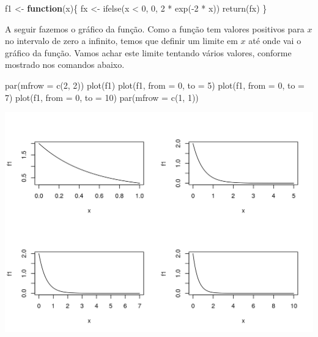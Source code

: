 \documentclass[
  10pt,
  a4paper]{book}
\newenvironment{Shaded}{\begin{snugshade}}{\end{snugshade}}
\newcommand{\AttributeTok}[1]{\textcolor[rgb]{0.77,0.63,0.00}{#1}}
\newcommand{\ControlFlowTok}[1]{\textcolor[rgb]{0.13,0.29,0.53}{\textbf{#1}}}
\newcommand{\DecValTok}[1]{\textcolor[rgb]{0.00,0.00,0.81}{#1}}
\newcommand{\FunctionTok}[1]{\textcolor[rgb]{0.00,0.00,0.00}{#1}}
\newcommand{\NormalTok}[1]{#1}
\newcommand{\OtherTok}[1]{\textcolor[rgb]{0.56,0.35,0.01}{#1}}
\newcommand{\SpecialCharTok}[1]{\textcolor[rgb]{0.00,0.00,0.00}{#1}}
\begin{document}
\begin{Shaded}
\begin{Highlighting}[]
\NormalTok{f1 }\OtherTok{\textless{}{-}} \ControlFlowTok{function}\NormalTok{(x)\{}
\NormalTok{    fx }\OtherTok{\textless{}{-}} \FunctionTok{ifelse}\NormalTok{(x }\SpecialCharTok{\textless{}} \DecValTok{0}\NormalTok{, }\DecValTok{0}\NormalTok{, }\DecValTok{2} \SpecialCharTok{*} \FunctionTok{exp}\NormalTok{(}\SpecialCharTok{{-}}\DecValTok{2} \SpecialCharTok{*}\NormalTok{ x))}
    \FunctionTok{return}\NormalTok{(fx)}
\NormalTok{\}}
\end{Highlighting}
\end{Shaded}

A seguir fazemos o gráfico da função. Como a função tem valores
positivos para \(x\) no intervalo de zero a infinito, temos que definir
um limite em \(x\) até onde vai o gráfico da função. Vamos achar este
limite tentando vários valores, conforme mostrado nos comandos abaixo.

\begin{Shaded}
\begin{Highlighting}[]
\FunctionTok{par}\NormalTok{(}\AttributeTok{mfrow =} \FunctionTok{c}\NormalTok{(}\DecValTok{2}\NormalTok{, }\DecValTok{2}\NormalTok{))}
\FunctionTok{plot}\NormalTok{(f1)}
\FunctionTok{plot}\NormalTok{(f1, }\AttributeTok{from =} \DecValTok{0}\NormalTok{, }\AttributeTok{to =} \DecValTok{5}\NormalTok{)}
\FunctionTok{plot}\NormalTok{(f1, }\AttributeTok{from =} \DecValTok{0}\NormalTok{, }\AttributeTok{to =} \DecValTok{7}\NormalTok{)}
\FunctionTok{plot}\NormalTok{(f1, }\AttributeTok{from =} \DecValTok{0}\NormalTok{, }\AttributeTok{to =} \DecValTok{10}\NormalTok{)}
\FunctionTok{par}\NormalTok{(}\AttributeTok{mfrow =} \FunctionTok{c}\NormalTok{(}\DecValTok{1}\NormalTok{, }\DecValTok{1}\NormalTok{))}
\end{Highlighting}
\end{Shaded}

\begin{center}\includegraphics{figures/unnamed-chunk-327-1} \end{center}
\end{document}
